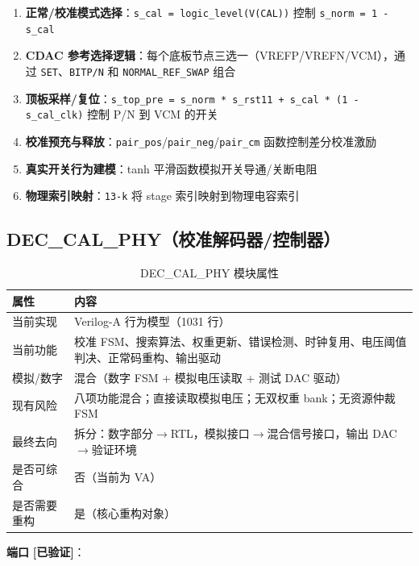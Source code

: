 \documentclass[UTF8,a4paper,11pt]{ctexart}
\newcommand{\verified}{\textcolor{verifiedgreen}{\textbf{[已验证]}}}
\begin{document}
\begin{enumerate}[leftmargin=2em]
\item \textbf{正常/校准模式选择}：\texttt{s\_cal = logic\_level(V(CAL))} 控制 \texttt{s\_norm = 1 - s\_cal}
\item \textbf{CDAC 参考选择逻辑}：每个底板节点三选一（VREFP/VREFN/VCM），通过 \texttt{SET}、\texttt{BITP/N} 和 \texttt{NORMAL\_REF\_SWAP} 组合
\item \textbf{顶板采样/复位}：\texttt{s\_top\_pre = s\_norm * s\_rst11 + s\_cal * (1 - s\_cal\_clk)} 控制 P/N 到 VCM 的开关
\item \textbf{校准预充与释放}：\texttt{pair\_pos}/\texttt{pair\_neg}/\texttt{pair\_cm} 函数控制差分校准激励
\item \textbf{真实开关行为建模}：tanh 平滑函数模拟开关导通/关断电阻
\item \textbf{物理索引映射}：\texttt{13-k} 将 stage 索引映射到物理电容索引
\end{enumerate}

\subsection{DEC\_CAL\_PHY（校准解码器/控制器）}

\begin{table}[H]
\centering
\caption{DEC\_CAL\_PHY 模块属性}
\label{tab:dec-attr}
\begin{tabular}{ll}
\toprule
属性 & 内容 \\
\midrule
当前实现   & Verilog-A 行为模型（1031 行） \\
当前功能   & 校准 FSM、搜索算法、权重更新、错误检测、时钟复用、电压阈值判决、正常码重构、输出驱动 \\
模拟/数字  & 混合（数字 FSM + 模拟电压读取 + 测试 DAC 驱动） \\
现有风险   & 八项功能混合；直接读取模拟电压；无双权重 bank；无资源仲裁 FSM \\
最终去向   & 拆分：数字部分$\rightarrow$RTL，模拟接口$\rightarrow$混合信号接口，输出 DAC$\rightarrow$验证环境 \\
是否可综合 & 否（当前为 VA） \\
是否需要重构 & 是（核心重构对象） \\
\bottomrule
\end{tabular}
\end{table}

\textbf{端口} \verified：
\end{document}
